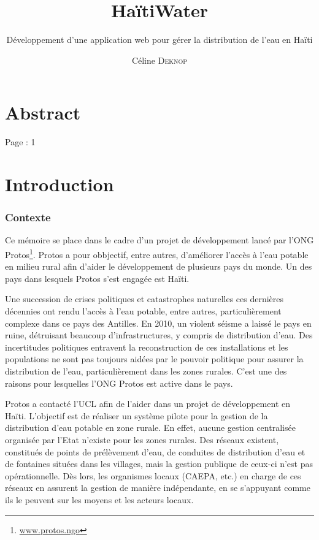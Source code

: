 \documentclass{eplmastersthesis_FR}
\title{HaïtiWater}
\subtitle{Développement d'une application web pour gérer la distribution de l'eau en Haïti}
\author{Céline \textsc{Deknop}}
\begin{document}
	\frontpage
	\tableofcontents

	\setlength{\parskip}{1.5em plus1em minus1em}


	\chapter*{Abstract}

		Page : 1

	\chapter{Introduction}


		\subsection*{Contexte}

			Ce mémoire se place dans le cadre d'un projet de développement lancé par l'ONG Protos\footnote{\href{https://www.protos.ngo/fr/}{www.protos.ngo}}. Protos a pour obbjectif, entre autres, d'améliorer l'accès à l'eau potable en milieu rural afin d'aider le développement de plusieurs pays du monde. Un des pays dans lesquels Protos s'est engagée est Haïti.

			Une succession de crises politiques et catastrophes naturelles ces dernières décennies ont rendu l'accès à l'eau potable, entre autres, particulièrement complexe dans ce pays des Antilles. En 2010, un violent séisme a laissé le pays en ruine, détruisant beaucoup d'infrastructures, y compris de distribution d'eau. Des incertitudes politiques entravent la reconstruction de ces installations et les populations ne sont pas toujours aidées par le pouvoir politique pour assurer la distribution de l'eau, particulièrement dans les zones rurales. C'est une des raisons pour lesquelles l'ONG Protos est active dans le pays.

			Protos a contacté l'UCL afin de l'aider dans un projet de développement en Haïti. L'objectif est de réaliser un système pilote pour la gestion de la distribution d'eau potable en zone rurale. En effet, aucune gestion centralisée organisée par l'Etat n'existe pour les zones rurales. Des réseaux existent, constitués de points de prélèvement d'eau, de conduites de distribution d'eau et de fontaines situées dans les villages, mais la gestion publique de ceux-ci n'est pas opérationnelle. Dès lors, les organismes locaux (CAEPA, etc.) en charge de ces réseaux en assurent la gestion de manière indépendante, en se s'appuyant comme ils le peuvent sur les moyens et les acteurs locaux.
\end{document}
